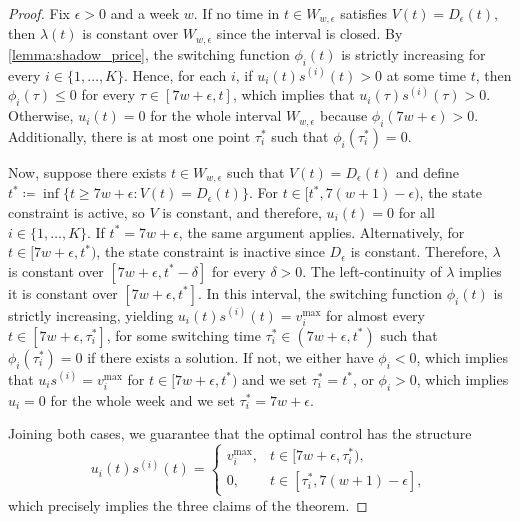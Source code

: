\documentclass[10pt,a4paper]{amsart}
\newcommand{\fori}[1]{#1 \in \{1,\dots, K\}}
\begin{document}
\begin{proof}
    Fix $\epsilon>0$ and a week $w$. 
    If no time in $t \in W_{w,\epsilon}$ satisfies $V(t)=D_\epsilon(t)$, then $\lambda(t)$ is constant over $W_{w,\epsilon}$ since the interval is closed.
    By \autoref{lemma:shadow_price}, the switching function $\phi_i(t)$ is strictly increasing for every $\fori{i}$.
    Hence, for each $i$, if $u_i(t)s^{(i)}(t) > 0$ at some time $t$, then $\phi_i(\tau) \le 0$ for every $\tau \in [7w+\epsilon, t]$, which implies that $u_i(\tau)s^{(i)}(\tau) > 0$.
    Otherwise, $u_i(t) = 0$ for the whole interval $W_{w,\epsilon}$ because $\phi_i(7w+\epsilon) > 0$.
    Additionally, there is at most one point $\tau^*_i$ such that $\phi_i(\tau_i^*) = 0$.
    
    Now, suppose there exists $t\in W_{w,\epsilon}$ such that $V(t)=D_\epsilon(t)$ and define $t^* \coloneqq \inf\{t \ge 7w+\epsilon: V(t)=D_\epsilon(t)\}$.
    For $t \in  [t^*,7(w+1)-\epsilon)$, the state constraint is active, so $V$ is constant, and therefore, $u_i(t) = 0$ for all $\fori{i}$.
    If $t^* = 7w + \epsilon$, the same argument applies. 
    Alternatively, for $t\in [7w+\epsilon,t^*)$, the state constraint is inactive since $D_{\epsilon}$ is constant.
    Therefore, $\lambda$ is constant over $[7w+\epsilon,t^*-\delta]$ for every $\delta > 0$.
    The left-continuity of $\lambda$ implies it is constant over $[7w+\epsilon,t^*]$.
    In this interval, the switching function $\phi_i(t)$ is strictly increasing, yielding $u_i(t)s^{(i)}(t)=v_i^{\max}$ for almost every $t \in [7w+\epsilon,\tau_i^*]$, for some switching time $\tau_i^* \in (7w+\epsilon, t^*)$ such that $\phi_i(\tau_i^*) = 0$ if there exists a solution.
    If not, we either have $\phi_i < 0$, which implies that $u_i s^{(i)} = v_i^{\max}$ for $t \in [7w + \epsilon, t^*)$ and we set $\tau_i^* = t^*$, or $\phi_i > 0$, which implies $u_i = 0$ for the whole week and we set $\tau_i^* = 7w + \epsilon$.

    Joining both cases, we guarantee that the optimal control has the structure
    \[
    u_i(t)s^{(i)}(t)=
    \begin{cases}
    v_i^{\max}, & t\in [7w+\epsilon,\tau_i^*), \\
    0, & t\in [\tau_i^*,7(w+1)-\epsilon],
    \end{cases}
    \]
    which precisely implies the three claims of the theorem.
\end{proof}
\end{document}
